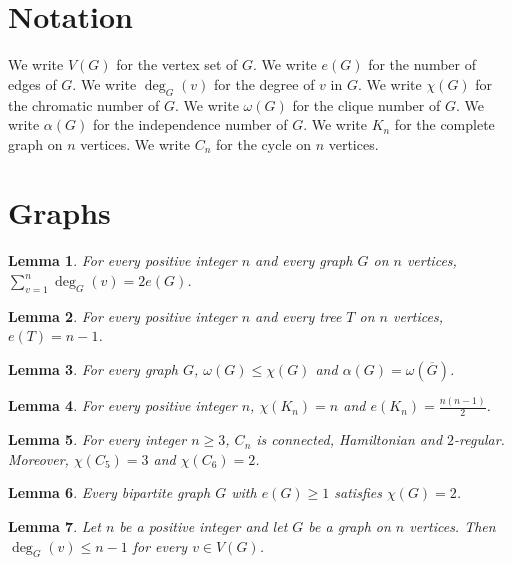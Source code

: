 \documentclass{article}
\newtheorem{lemma}{Lemma}
\begin{document}
\section{Notation}

We write $V(G)$ for the vertex set of $G$.
We write $e(G)$ for the number of edges of $G$.
We write $\deg_G(v)$ for the degree of $v$ in $G$.
We write $\chi(G)$ for the chromatic number of $G$.
We write $\omega(G)$ for the clique number of $G$.
We write $\alpha(G)$ for the independence number of $G$.
We write $K_n$ for the complete graph on $n$ vertices.
We write $C_n$ for the cycle on $n$ vertices.

\section{Graphs}

\begin{lemma}\label{handshake}
For every positive integer $n$ and every graph $G$ on $n$ vertices, $\sum_{v=1}^{n}\deg_G(v)=2e(G)$.
\end{lemma}

\begin{lemma}\label{trees}
For every positive integer $n$ and every tree $T$ on $n$ vertices, $e(T)=n-1$.
\end{lemma}

\begin{lemma}\label{clique}
For every graph $G$, $\omega(G)\le\chi(G)$ and $\alpha(G)=\omega(\overline{G})$.
\end{lemma}

\begin{lemma}\label{complete}
For every positive integer $n$, $\chi(K_n)=n$ and $e(K_n)=\frac{n(n-1)}{2}$.
\end{lemma}

\begin{lemma}\label{cycles}
For every integer $n\ge3$, $C_n$ is connected, Hamiltonian and $2$-regular. Moreover, $\chi(C_5)=3$ and $\chi(C_6)=2$.
\end{lemma}

\begin{lemma}\label{bipartite}
Every bipartite graph $G$ with $e(G)\ge1$ satisfies $\chi(G)=2$.
\end{lemma}

\begin{lemma}\label{degree}
Let $n$ be a positive integer and let $G$ be a graph on $n$ vertices. Then $\deg_G(v)\le n-1$ for every $v\in V(G)$.
\end{lemma}
\end{document}
